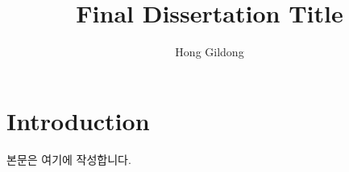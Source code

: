\documentclass[b5paper,11pt]{report}
\title{Final Dissertation Title}
\author{Hong Gildong}
\begin{document}
\maketitlepage
\makeapprovalpage

\tableofcontents

\clearpage{}\setcounter{page}{1}


\chapter{Introduction}

본문은 여기에 작성합니다.

\clearpage
\makeabstractpage
\end{document}
